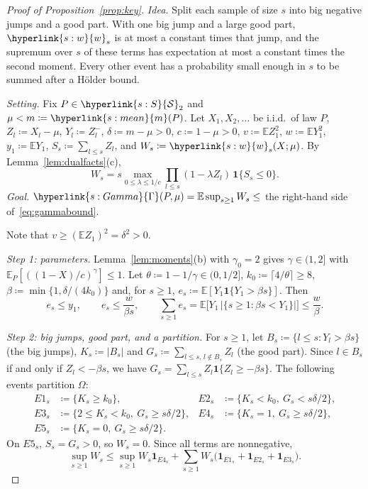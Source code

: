 \documentclass[11pt]{article}
\newcommand{\E}{\mathbb{E}}
\newcommand{\ind}{\mathbf{1}}
\newcommand{\sy}[2]{{\hyperlink{#1}{#2}}}
\newcommand{\Sm}{\sy{s:S}{\mathcal{S}}}
\newcommand{\mean}{\sy{s:mean}{m}}
\newcommand{\ws}{\sy{s:w}{w}}
\newcommand{\Gam}{\sy{s:Gamma}{\Gamma}}
\begin{document}
\begin{proof}[Proof of Proposition~\ref{prop:key}]
\emph{Idea.} Split each sample of size $s$ into big negative jumps and a good part. With one big
jump and a large good part, $\ws_s$ is at most a constant times that jump, and the supremum over $s$
of these terms has expectation at most a constant times the second moment. Every other event has a
probability small enough in $s$ to be summed after a H\"older bound.

\emph{Setting.} Fix $P\in\Sm_2$ and $\mu<m\coloneqq \mean(P)$. Let $X_1,X_2,\dots$ be i.i.d.\ of law $P$,
$Z_l\coloneqq X_l-\mu$, $Y_l\coloneqq Z_l^-$, $\delta\coloneqq m-\mu>0$, $c\coloneqq1-\mu>0$,
$v\coloneqq\E Z_1^2$, $w\coloneqq\E Y_1^2$, $y_1\coloneqq\E Y_1$, $S_s\coloneqq\sum_{l\le s}Z_l$, and
$W_s\coloneqq \ws_s(X;\mu)$. By Lemma~\ref{lem:dualfacts}(c),
\[
  W_s=s\max_{0\le\lambda\le1/c}\prod_{l\le s}(1-\lambda Z_l)\,\ind\{S_s\le0\}.
\]
\emph{Goal.} $\Gam(P,\mu)=\E\sup_{s\ge1}W_s\le$ the right-hand side of~\eqref{eq:gammabound}.

Note that $v\ge(\E Z_1)^2=\delta^2>0$.

\emph{Step 1: parameters.} Lemma~\ref{lem:moments}(b) with $\gamma_0=2$ gives $\gamma\in(1,2]$ with
$\E_P[((1-X)/c)^\gamma]\le1$. Let $\theta\coloneqq1-1/\gamma\in(0,1/2]$, $k_0\coloneqq\lceil4/\theta\rceil\ge8$,
$\beta\coloneqq\min\{1,\delta/(4k_0)\}$ and, for $s\ge1$, $e_s\coloneqq\E[Y_1\ind\{Y_1>\beta s\}]$. Then
\begin{equation}\label{eq:es}
  e_s\le y_1,\qquad e_s\le\frac{w}{\beta s},\qquad\sum_{s\ge1}e_s=\E\big[Y_1\,|\{s\ge1:\beta s<Y_1\}|\big]\le\frac{w}{\beta}.
\end{equation}

\emph{Step 2: big jumps, good part, and a partition.} For $s\ge1$, let
$B_s\coloneqq\{l\le s:Y_l>\beta s\}$ (the big jumps), $K_s\coloneqq|B_s|$ and
$G_s\coloneqq\sum_{l\le s,\,l\notin B_s}Z_l$ (the good part). Since $l\in B_s$ if and only if
$Z_l<-\beta s$, we have $G_s=\sum_{l\le s}Z_l\ind\{Z_l\ge-\beta s\}$. The following events partition
$\Omega$:
\begin{align*}
  E1_s&\coloneqq\{K_s\ge k_0\}, & E2_s&\coloneqq\{K_s<k_0,\ G_s<s\delta/2\},\\
  E3_s&\coloneqq\{2\le K_s<k_0,\ G_s\ge s\delta/2\}, & E4_s&\coloneqq\{K_s=1,\ G_s\ge s\delta/2\},\\
  E5_s&\coloneqq\{K_s=0,\ G_s\ge s\delta/2\}.
\end{align*}
On $E5_s$, $S_s=G_s>0$, so $W_s=0$. Since all terms are nonnegative,
\begin{equation}\label{eq:split}
  \sup_{s\ge1}W_s\le\sup_{s\ge1}W_s\ind_{E4_s}+\sum_{s\ge1}W_s\big(\ind_{E1_s}+\ind_{E2_s}+\ind_{E3_s}\big).
\end{equation}


\end{proof}
\end{document}
